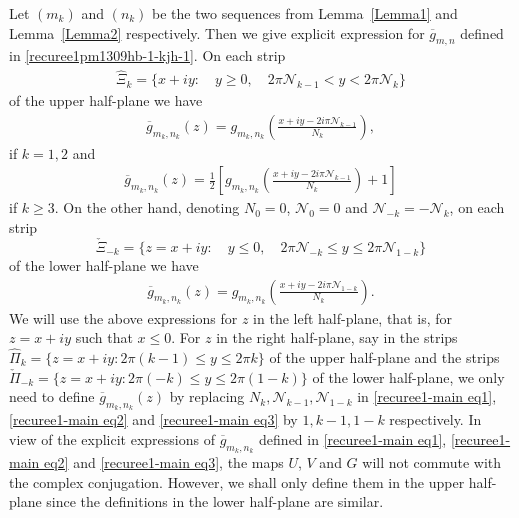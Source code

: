 \documentclass[12pt]{amsart}
\numberwithin{equation}{section}
\begin{document}
Let $(m_k)$ and $(n_k)$ be the two sequences from Lemma~\ref{Lemma1} and Lemma~\ref{Lemma2} respectively. Then we give explicit expression for $\overline{g}_{m,n}$ defined in \eqref{recuree1pm1309hb-1-kjh-1}. On each strip
\begin{equation*}%
\begin{split}
\hat{\Xi}_k=\{x+iy: \quad y\geq0, \quad 2\pi\mathcal{N}_{k-1}<y< 2\pi\mathcal{N}_k\}
\end{split}
\end{equation*}
of the upper half-plane we have
\begin{equation}\label{recuree1-main eq1}
\begin{split}
\overline{g}_{m_k,n_k}(z)=g_{m_k,n_k}\left(\frac{x+iy-2i\pi\mathcal{N}_{k-1}}{N_k}\right),
\end{split}
\end{equation}
if $k=1,2$ and
\begin{equation}\label{recuree1-main eq2}
\begin{split}
\overline{g}_{m_k,n_k}(z)=
\frac{1}{2}\left[g_{m_k,n_k}\left(\frac{x+iy-2i\pi\mathcal{N}_{k-1}}{N_k}\right)+1\right]
\end{split}
\end{equation}
if $k\geq 3$. On the other hand, denoting $N_{0}=0$, $\mathcal{N}_{0}=0$ and $\mathcal{N}_{-k}=-\mathcal{N}_{k}$, on each strip
\begin{equation*}
\check{\Xi}_{-k}=\{z=x+iy: \quad y\leq 0, \quad 2\pi\mathcal{N}_{-k}\leq y\leq 2\pi \mathcal{N}_{1-k}\}
\end{equation*}
of the lower half-plane we have
\begin{equation}\label{recuree1-main eq3}
\begin{split}
\overline{g}_{m_k,n_k}(z)=g_{m_k,n_k}\left(\frac{x+iy-2i\pi\mathcal{N}_{1-k}}{N_{k}}\right).
\end{split}
\end{equation}
We will use the above expressions for $z$ in the left half-plane, that is, for $z=x+iy$ such that $x\leq 0$. For $z$ in the right half-plane, say in the strips $\hat{\Pi}_k=\{z=x+iy: 2\pi(k-1)\leq y\leq 2\pi k\}$ of the upper half-plane and the strips $\check{\Pi}_{-k}=\{z=x+iy: 2\pi(-k)\leq y\leq 2\pi (1-k)\}$ of the lower half-plane, we only need to define $\overline{g}_{m_k,n_k}(z)$ by replacing $N_k,\mathcal{N}_{k-1},\mathcal{N}_{1-k}$ in \eqref{recuree1-main eq1}, \eqref{recuree1-main eq2} and \eqref{recuree1-main eq3} by $1,k-1,1-k$ respectively. In view of the explicit expressions of $\overline{g}_{m_k,n_k}$ defined in \eqref{recuree1-main eq1}, \eqref{recuree1-main eq2} and \eqref{recuree1-main eq3}, the maps $U$, $V$ and $G$ will not commute with the complex conjugation. However, we shall only define them in the upper half-plane since the definitions in the lower half-plane are similar.
\end{document}
